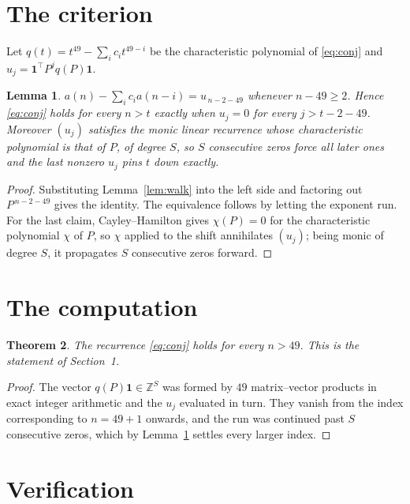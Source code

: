\documentclass[11pt,a4paper]{article}
\theoremstyle{plain}
\newtheorem{theorem}{Theorem}
\newtheorem{lemma}[theorem]{Lemma}
\theoremstyle{definition}
\begin{document}
\section{The criterion}

Let $q(t)=t^{49}-\sum_i c_i t^{49-i}$ be the characteristic polynomial of
\eqref{eq:conj} and $u_j=\mathbf{1}^{\!\top}P^{j}q(P)\mathbf{1}$.

\begin{lemma}\label{lem:crit}
$a(n)-\sum_i c_i a(n-i)=u_{\,n-2-49}$ whenever $n-49\ge2$. Hence
\eqref{eq:conj} holds for every $n>t$ exactly when $u_j=0$ for every
$j>t-2-49$. Moreover $(u_j)$ satisfies the monic linear recurrence whose
characteristic polynomial is that of $P$, of degree $S$, so $S$ consecutive zeros force all
later ones and the last nonzero $u_j$ pins $t$ down exactly.
\end{lemma}

\begin{proof}
Substituting Lemma~\ref{lem:walk} into the left side and factoring out
$P^{\,n-2-49}$ gives the identity. The equivalence follows by letting the exponent
run. For the last claim, Cayley--Hamilton gives $\chi(P)=0$ for the characteristic
polynomial $\chi$ of $P$, so $\chi$ applied to the shift annihilates $(u_j)$; being monic of
degree $S$, it propagates $S$ consecutive zeros forward.
\end{proof}

\section{The computation}

\begin{theorem}
The recurrence \eqref{eq:conj} holds for every $n>49$. This is the statement of
Section~1.
\end{theorem}

\begin{proof}
The vector $q(P)\mathbf{1}\in\mathbb{Z}^{S}$ was formed by $49$ matrix--vector
products in exact integer arithmetic and the $u_j$ evaluated in turn. They vanish from the
index corresponding to $n=49+1$ onwards, and the run was continued past $S$ consecutive
zeros, which by Lemma~\ref{lem:crit} settles every larger index.
\end{proof}

\section{Verification}
\end{document}
